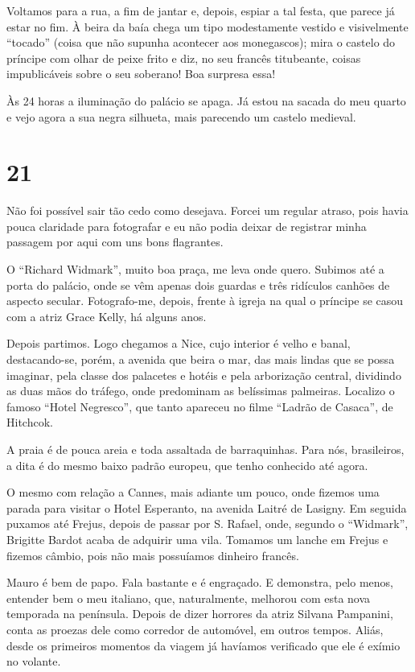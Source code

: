 Voltamos para a rua, a fim de jantar e, depois, espiar a tal festa, que parece já estar no fim. À beira da baía chega um tipo modestamente vestido e visivelmente ``tocado'' (coisa que não supunha acontecer aos monegascos); mira o castelo do príncipe com olhar de peixe frito e diz, no seu francês titubeante, coisas impublicáveis sobre o seu soberano! Boa surpresa essa!

Às 24 horas a iluminação do palácio se apaga. Já estou na sacada do meu quarto e vejo agora a sua negra silhueta, mais parecendo um castelo medieval.

\section*{21 \adfflatleafright {}}
Não foi possível sair tão cedo como desejava. Forcei um regular atraso, pois havia pouca claridade para fotografar e eu não podia deixar de registrar minha passagem por aqui com uns bons flagrantes.

O ``Richard Widmark'', muito boa praça, me leva onde quero. Subimos até a porta do palácio, onde se vêm apenas dois guardas e três ridículos canhões de aspecto secular. Fotografo-me, depois, frente à igreja na qual o príncipe se casou com a atriz Grace Kelly, há alguns anos.

Depois partimos. Logo chegamos a Nice, cujo interior é velho e banal, destacando-se, porém, a avenida que beira o mar, das mais lindas que se possa imaginar, pela classe dos palacetes e hotéis e pela arborização central, dividindo as duas mãos do tráfego, onde predominam as belíssimas palmeiras. Localizo o famoso ``Hotel Negresco'', que tanto apareceu no filme ``Ladrão de Casaca'', de Hitchcok.

A praia é de pouca areia e toda assaltada de barraquinhas. Para nós, brasileiros, a dita é do mesmo baixo padrão europeu, que tenho conhecido até agora.

O mesmo com relação a Cannes, mais adiante um pouco, onde fizemos uma parada para visitar o Hotel Esperanto, na avenida Laitré de Lasigny. Em seguida puxamos até Frejus, depois de passar por S. Rafael, onde, segundo o ``Widmark'', Brigitte Bardot acaba de adquirir uma vila. Tomamos um lanche em Frejus e fizemos câmbio, pois não mais possuíamos dinheiro francês.

Mauro é bem de papo. Fala bastante e é engraçado. E demonstra, pelo menos, entender bem o meu italiano, que, naturalmente, melhorou com esta nova temporada na península. Depois de dizer horrores da atriz Silvana Pampanini, conta as proezas dele como corredor de automóvel, em outros tempos. Aliás, desde os primeiros momentos da viagem já havíamos verificado que ele é exímio no volante.

